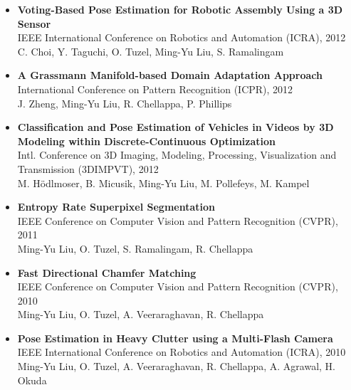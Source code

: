\documentclass[10pt,letterpaper]{article}
\begin{document}
\begin{itemize}
\item           {\bf Voting-Based Pose Estimation for Robotic Assembly Using a 3D Sensor}\\
                IEEE International Conference on Robotics and Automation (ICRA), 2012\\
                C. Choi, Y. Taguchi, O. Tuzel, {Ming-Yu Liu}, S. Ramalingam\vspace{-2mm}

\item           {\bf A Grassmann Manifold-based Domain Adaptation Approach}\\
                International Conference on Pattern Recognition (ICPR), 2012\\
                J. Zheng, {Ming-Yu Liu}, R. Chellappa, P. Phillips\vspace{-2mm}

\item           {\bf Classification and Pose Estimation of Vehicles in Videos by 3D Modeling within Discrete-Continuous Optimization}\\
                Intl. Conference on 3D Imaging, Modeling, Processing, Visualization and Transmission (3DIMPVT), 2012\\
                M. Hödlmoser, B. Micusik, {Ming-Yu Liu}, M. Pollefeys, M. Kampel\vspace{-2mm}

\item           {\bf Entropy Rate Superpixel Segmentation}\\
                IEEE Conference on Computer Vision and Pattern Recognition (CVPR), 2011\\
                {Ming-Yu Liu}, O. Tuzel, S. Ramalingam, R. Chellappa\vspace{-2mm}

\item           {\bf Fast Directional Chamfer Matching}\\
                IEEE Conference on Computer Vision and Pattern Recognition (CVPR), 2010\\
                {Ming-Yu Liu}, O. Tuzel, A. Veeraraghavan, R. Chellappa\vspace{-2mm}

\item           {\bf Pose Estimation in Heavy Clutter using a Multi-Flash Camera}\\
                IEEE International Conference on Robotics and Automation (ICRA), 2010\\
                {Ming-Yu Liu}, O. Tuzel, A. Veeraraghavan, R. Chellappa, A. Agrawal, H. Okuda
\end{itemize}
\end{document}
